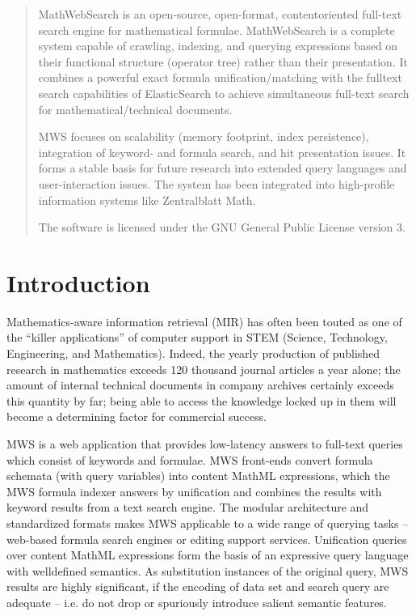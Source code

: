 \documentclass{deliverablereport}
\author{Michael Kohlhase \& Alexandru Glontaru}
\begin{document}
\maketitle
\begin{abstract}
MathWebSearch is an open-source, open-format, contentoriented full-text search engine for mathematical formulae. MathWebSearch is a complete system capable of crawling, indexing, and querying expressions based on their functional structure (operator tree) rather than their presentation. It combines a powerful exact formula unification/matching with the fulltext search capabilities of ElasticSearch to achieve simultaneous full-text search for mathematical/technical documents. \par
MWS focuses on scalability (memory footprint, index persistence), integration of keyword- and formula search, and hit presentation issues. It forms a stable basis for future research into extended query languages and user-interaction issues. The system has been integrated into high-profile information systems like Zentralblatt Math. \par 
The software is licensed under the GNU General Public License version 3. \par 
 
\end{abstract}
\newpage\tableofcontents\listoffigures\newpage

\section{Introduction}\label{sec:intro}
Mathematics-aware information retrieval (MIR) has often been touted as one of the “killer applications” of computer support in STEM (Science, Technology, Engineering, and Mathematics). Indeed, the yearly production of published research in mathematics exceeds 120 thousand journal articles a year alone; the amount of internal technical documents in company archives certainly exceeds this quantity by far; being able to access the knowledge locked up in them will become a determining factor for commercial success. \par

MWS is a web application that provides low-latency answers to full-text queries which consist of keywords and formulae. MWS front-ends convert formula schemata (with query variables) into content MathML expressions, which the MWS formula indexer answers by unification and combines the results with keyword results from a text search engine. The modular architecture and standardized formats makes MWS applicable to a wide range of querying tasks – web-based formula search engines or editing support services. Unification queries over content MathML expressions form the basis of an expressive query language with welldefined semantics. As substitution instances of the original query, MWS results are highly significant, if the encoding of data set and search query are adequate – i.e. do not drop or spuriously introduce salient semantic features. \par
\end{document}
